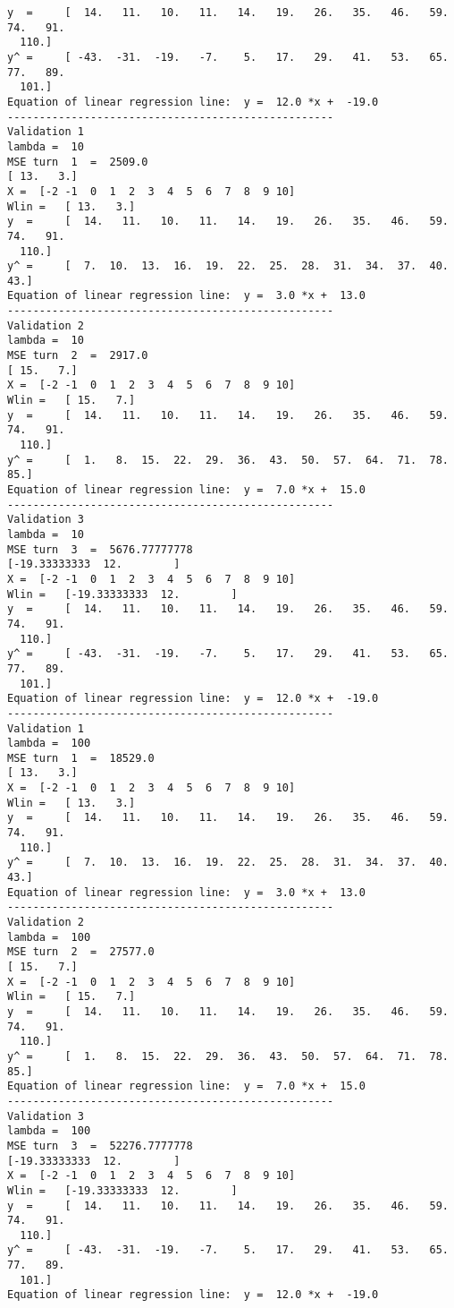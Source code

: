 \documentclass{article}
\begin{document}
\begin{lstlisting}[breaklines=true,basicstyle=\small]
y  =	 [  14.   11.   10.   11.   14.   19.   26.   35.   46.   59.   74.   91.
  110.]
y^ =	 [ -43.  -31.  -19.   -7.    5.   17.   29.   41.   53.   65.   77.   89.
  101.]
Equation of linear regression line:  y =  12.0 *x +  -19.0
---------------------------------------------------
Validation 1
lambda =  10
MSE turn  1  =  2509.0
[ 13.   3.]
X =	 [-2 -1  0  1  2  3  4  5  6  7  8  9 10]
Wlin =	 [ 13.   3.]
y  =	 [  14.   11.   10.   11.   14.   19.   26.   35.   46.   59.   74.   91.
  110.]
y^ =	 [  7.  10.  13.  16.  19.  22.  25.  28.  31.  34.  37.  40.  43.]
Equation of linear regression line:  y =  3.0 *x +  13.0
---------------------------------------------------
Validation 2
lambda =  10
MSE turn  2  =  2917.0
[ 15.   7.]
X =	 [-2 -1  0  1  2  3  4  5  6  7  8  9 10]
Wlin =	 [ 15.   7.]
y  =	 [  14.   11.   10.   11.   14.   19.   26.   35.   46.   59.   74.   91.
  110.]
y^ =	 [  1.   8.  15.  22.  29.  36.  43.  50.  57.  64.  71.  78.  85.]
Equation of linear regression line:  y =  7.0 *x +  15.0
---------------------------------------------------
Validation 3
lambda =  10
MSE turn  3  =  5676.77777778
[-19.33333333  12.        ]
X =	 [-2 -1  0  1  2  3  4  5  6  7  8  9 10]
Wlin =	 [-19.33333333  12.        ]
y  =	 [  14.   11.   10.   11.   14.   19.   26.   35.   46.   59.   74.   91.
  110.]
y^ =	 [ -43.  -31.  -19.   -7.    5.   17.   29.   41.   53.   65.   77.   89.
  101.]
Equation of linear regression line:  y =  12.0 *x +  -19.0
---------------------------------------------------
Validation 1
lambda =  100
MSE turn  1  =  18529.0
[ 13.   3.]
X =	 [-2 -1  0  1  2  3  4  5  6  7  8  9 10]
Wlin =	 [ 13.   3.]
y  =	 [  14.   11.   10.   11.   14.   19.   26.   35.   46.   59.   74.   91.
  110.]
y^ =	 [  7.  10.  13.  16.  19.  22.  25.  28.  31.  34.  37.  40.  43.]
Equation of linear regression line:  y =  3.0 *x +  13.0
---------------------------------------------------
Validation 2
lambda =  100
MSE turn  2  =  27577.0
[ 15.   7.]
X =	 [-2 -1  0  1  2  3  4  5  6  7  8  9 10]
Wlin =	 [ 15.   7.]
y  =	 [  14.   11.   10.   11.   14.   19.   26.   35.   46.   59.   74.   91.
  110.]
y^ =	 [  1.   8.  15.  22.  29.  36.  43.  50.  57.  64.  71.  78.  85.]
Equation of linear regression line:  y =  7.0 *x +  15.0
---------------------------------------------------
Validation 3
lambda =  100
MSE turn  3  =  52276.7777778
[-19.33333333  12.        ]
X =	 [-2 -1  0  1  2  3  4  5  6  7  8  9 10]
Wlin =	 [-19.33333333  12.        ]
y  =	 [  14.   11.   10.   11.   14.   19.   26.   35.   46.   59.   74.   91.
  110.]
y^ =	 [ -43.  -31.  -19.   -7.    5.   17.   29.   41.   53.   65.   77.   89.
  101.]
Equation of linear regression line:  y =  12.0 *x +  -19.0
\end{lstlisting}
\end{document}
